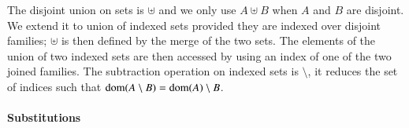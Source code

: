 \documentclass{elsarticle}
\begin{document}
The disjoint union on sets is $\uplus$ and we only use $A\uplus B$ when $A$ and $B$ are disjoint. We extend it to   union  of indexed sets provided they are indexed over disjoint families;  $\uplus$  is then defined by the merge of the 
two sets.
The elements
of the union of two indexed sets are then accessed by using an index of one of the two
joined families.
The  subtraction operation on indexed sets is $\setminus$, it reduces the set of indices such that $\operatorname{dom}(A\setminus B)=\operatorname{dom}(A)\setminus B$.



\paragraph{Substitutions}
\label{def:substitutions}
\end{document}

